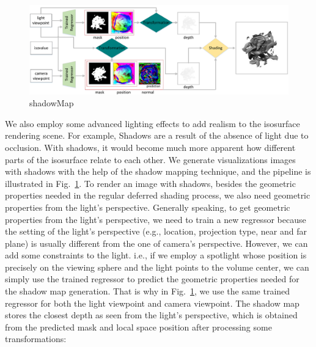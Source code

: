 \documentclass[journal]{vgtc}                %
\begin{document}
\begin{figure}
  \centering
  \includegraphics[width=0.8\linewidth]{shadowMap}
  \caption{shadowMap}
  \label{fig:shadowMap}
\end{figure}

We also employ some advanced lighting effects to add realism to the isosurface rendering scene. For example, Shadows are a result of the absence of light due to occlusion. With shadows, it would become much more apparent how different parts of the isosurface relate to each other.
We generate visualizations images with shadows with the help of the shadow mapping \cite{williams1978casting} technique, and the pipeline is illustrated in Fig.~\ref{fig:shadowMap}. To render an image with shadows, besides the geometric properties needed in the regular deferred shading process, we also need geometric properties from the light's perspective. Generally speaking, to get geometric properties from the light's perspective, we need to train a new regressor because the setting of the light's perspective (e.g., location, projection type, near and far plane) is usually different from the one of camera's perspective. However, we can add some constraints to the light. i.e., if we employ a spotlight whose position is precisely on the viewing sphere and the light points to the volume center, we can simply use the trained regressor to predict the geometric properties needed for the shadow map generation. That is why in Fig.~\ref{fig:shadowMap}, we use the same trained regressor for both the light viewpoint and camera viewpoint. The shadow map stores the closest depth as seen from the light's perspective, which is obtained from the predicted mask and local space position after processing some transformations: 
\end{document}
